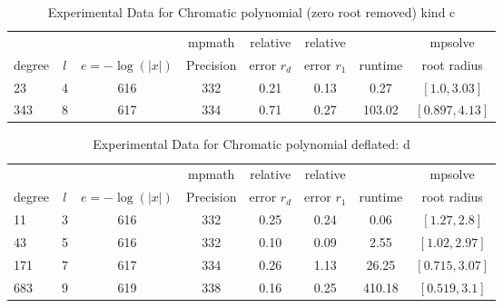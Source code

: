 \documentclass[sigconf]{acmart}
\begin{document}
\begin{table}[t]
\caption{Experimental Data for Chromatic polynomial (zero root removed) kind c}
\label{tab:chrmc}
\vskip 0.15in
\begin{center}
\begin{small}
\begin{sc}
\begin{tabular}{lccccccc}
\toprule
&  &  & mpmath & relative  & relative &  & mpsolve \\
degree  & $l$& $e=-\log(|x|)$& Precision &error $r_d$       & error $r_1$ &runtime& root radius\\
\midrule
 23   & 4 & 616 & 332 & 0.21 & 0.13 & 0.27 & $[1.0, 3.03]$ \\
 343 & 8 & 617 & 334 & 0.71 & 0.27 & 103.02 & $[0.897, 4.13]$\\
\bottomrule
\end{tabular}
\end{sc}
\end{small}
\end{center}
\vskip -0.1in
\end{table}


\begin{table}[t]
\caption{Experimental Data for Chromatic polynomial deflated: d}
\label{tab:chrmc_d}
\vskip 0.15in
\begin{center}
\begin{small}
\begin{sc}
\begin{tabular}{lccccccc}
\toprule
&  &  & mpmath & relative  & relative &  & mpsolve \\
degree  & $l$& $e=-\log(|x|)$& Precision &error $r_d$       & error $r_1$ &runtime& root radius\\
\midrule
   11 & 3 & 616 & 332 & 0.25 & 0.24 & 0.06     & $[1.27, 2.8]$ \\
   43 & 5 & 616 & 332 & 0.10 & 0.09 & 2.55     & $[1.02, 2.97]$\\
 171 & 7 & 617 & 334 & 0.26 & 1.13 & 26.25   & $[0.715, 3.07]$\\
 683 & 9 & 619 & 338 & 0.16 & 0.25 & 410.18 & $[0.519, 3.1]$\\
\bottomrule
\end{tabular}
\end{sc}
\end{small}
\end{center}
\vskip -0.1in
\end{table}
\end{document}
